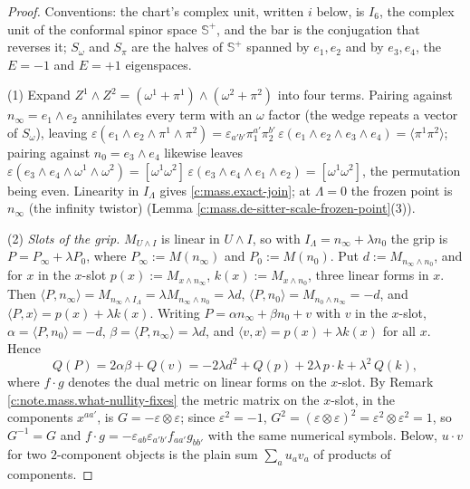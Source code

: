 \documentclass[11pt]{article}
\theoremstyle{definition}
\theoremstyle{plain}
\providecommand{\CS}{}\renewcommand{\CS}{{\mathbb{S}^{+}}}
\providecommand{\Som}{}\renewcommand{\Som}{S_\omega}
\providecommand{\Spi}{}\renewcommand{\Spi}{S_\pi}
\providecommand{\br}{}\renewcommand{\br}[1]{\langle #1\rangle}
\providecommand{\ip}{}\renewcommand{\ip}[2]{\langle #1, #2\rangle}
\begin{document}
\begin{proof}
Conventions: the chart's complex unit, written $i$ below, is $I_{6}$, the complex unit of the conformal spinor space $\CS$, and the bar is the conjugation that reverses it; $\Som$ and $\Spi$ are the halves of $\CS$ spanned by $e_{1}, e_{2}$ and by $e_{3}, e_{4}$, the $E = -1$ and $E = +1$ eigenspaces.

(1) Expand $Z^{1}\wedge Z^{2} = (\omega^{1} + \pi^{1})\wedge(\omega^{2} + \pi^{2})$ into four terms. Pairing against $n_{\infty} = e_{1}\wedge e_{2}$ annihilates every term with an $\omega$ factor (the wedge repeats a vector of $\Som$), leaving $\varepsilon(e_{1}\wedge e_{2}\wedge\pi^{1}\wedge\pi^{2}) = \varepsilon_{a'b'}\pi_{1}^{a'}\pi_{2}^{b'}\,\varepsilon(e_{1}\wedge e_{2}\wedge e_{3}\wedge e_{4}) = \br{\pi^{1}\pi^{2}}$; pairing against $n_{0} = e_{3}\wedge e_{4}$ likewise leaves $\varepsilon(e_{3}\wedge e_{4}\wedge\omega^{1}\wedge\omega^{2}) = [\omega^{1}\omega^{2}]\,\varepsilon(e_{3}\wedge e_{4}\wedge e_{1}\wedge e_{2}) = [\omega^{1}\omega^{2}]$, the permutation being even. Linearity in $I_{\Lambda}$ gives \ref{c:mass.exact-join}; at $\Lambda = 0$ the frozen point is $n_{\infty}$ (the infinity twistor) (Lemma \ref{c:mass.de-sitter-scale-frozen-point}(3)).

(2) \emph{Slots of the grip.} $M_{U\wedge I}$ is linear in $U \wedge I$, so with $I_{\Lambda} = n_{\infty} + \lambda n_{0}$ the grip is $P = P_{\infty} + \lambda P_{0}$, where $P_{\infty} := M(n_{\infty})$ and $P_{0} := M(n_{0})$. Put $d := M_{n_{\infty}\wedge n_{0}}$, and for $x$ in the $x$-slot $p(x) := M_{x\wedge n_{\infty}}$, $k(x) := M_{x\wedge n_{0}}$, three linear forms in $x$. Then $\ip{P}{n_{\infty}} = M_{n_{\infty}\wedge I_{\Lambda}} = \lambda M_{n_{\infty}\wedge n_{0}} = \lambda d$, $\ip{P}{n_{0}} = M_{n_{0}\wedge n_{\infty}} = -d$, and $\ip{P}{x} = p(x) + \lambda k(x)$. Writing $P = \alpha n_{\infty} + \beta n_{0} + v$ with $v$ in the $x$-slot, $\alpha = \ip{P}{n_{0}} = -d$, $\beta = \ip{P}{n_{\infty}} = \lambda d$, and $\ip{v}{x} = p(x) + \lambda k(x)$ for all $x$. Hence
\[
Q(P) = 2\alpha\beta + Q(v) = -2\lambda d^{2} + Q(p) + 2\lambda\, p\cdot k + \lambda^{2}\, Q(k),
\]
where $f \cdot g$ denotes the dual metric on linear forms on the $x$-slot. By Remark \ref{c:note.mass.what-nullity-fixes} the metric matrix on the $x$-slot, in the components $x^{aa'}$, is $G = -\varepsilon\otimes\varepsilon$; since $\varepsilon^{2} = -1$, $G^{2} = (\varepsilon\otimes\varepsilon)^{2} = \varepsilon^{2}\otimes\varepsilon^{2} = 1$, so $G^{-1} = G$ and $f\cdot g = -\varepsilon_{ab}\varepsilon_{a'b'}f_{aa'}g_{bb'}$ with the same numerical symbols. Below, $u\cdot v$ for two $2$-component objects is the plain sum $\sum_{a}u_{a}v_{a}$ of products of components.


\end{proof}
\end{document}
